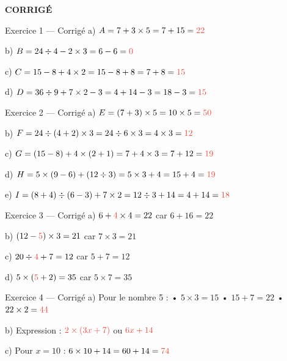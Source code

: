 \documentclass[11pt,a4paper]{article}
\DeclareRobustCommand{\rep}[1]{\begingroup\color{warning}\ifmmode #1\else \textbf{#1}\fi\endgroup}
\begin{document}
	\newpage
	
	
	\begin{center}
		\Large\textbf{CORRIGÉ}
	\end{center}
	
	\begin{exercisebox}{ Exercice 1 — Corrigé}
		a) $A = 7 + 3 \times 5 = 7 + 15 = \rep{22}$
		
		b) $B = 24 \div 4 - 2 \times 3 = 6 - 6 = \rep{0}$
		
		c) $C = 15 - 8 + 4 \times 2 = 15 - 8 + 8 = 7 + 8 = \rep{15}$
		
		d) $D = 36 \div 9 + 7 \times 2 - 3 = 4 + 14 - 3 = 18 - 3 = \rep{15}$
	\end{exercisebox}
	
	\begin{exercisebox}{ Exercice 2 — Corrigé}
		a) $E = (7 + 3) \times 5 = 10 \times 5 = \rep{50}$
		
		b) $F = 24 \div (4 + 2) \times 3 = 24 \div 6 \times 3 = 4 \times 3 = \rep{12}$
		
		c) $G = (15 - 8) + 4 \times (2 + 1) = 7 + 4 \times 3 = 7 + 12 = \rep{19}$
		
		d) $H = 5 \times (9 - 6) + (12 \div 3) = 5 \times 3 + 4 = 15 + 4 = \rep{19}$
		
		e) $I = (8 + 4) \div (6 - 3) + 7 \times 2 = 12 \div 3 + 14 = 4 + 14 = \rep{18}$
	\end{exercisebox}
	
	\begin{exercisebox}{ Exercice 3 — Corrigé}
		a) $6 + \rep{4} \times 4 = 22$ car $6 + 16 = 22$
		
		b) $(12 - \rep{5}) \times 3 = 21$ car $7 \times 3 = 21$
		
		c) $20 \div \rep{4} + 7 = 12$ car $5 + 7 = 12$
		
		d) $5 \times (\rep{5} + 2) = 35$ car $5 \times 7 = 35$
	\end{exercisebox}
	
	\begin{exercisebox}{ Exercice 4 — Corrigé}
		a) Pour le nombre 5 :
		• $5 \times 3 = 15$
		• $15 + 7 = 22$
		• $22 \times 2 = \rep{44}$
		
		b) Expression : $\rep{2 \times (3x + 7)}$ ou $\rep{6x + 14}$
		
		c) Pour $x = 10$ : $6 \times 10 + 14 = 60 + 14 = \rep{74}$
	\end{exercisebox}
	
\end{document}
